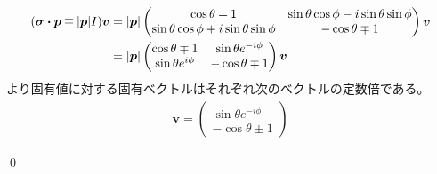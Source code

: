 \documentclass[uplatex,dvipdfmx,a4paper,11pt]{jlreq}
\makeatletter
\newcommand{\pp}{\bm{p}}
\theoremstyle{definition}
\renewenvironment{proof}[1][\proofname]{\par
  \normalfont
  \topsep6\p@\@plus6\p@ \trivlist
  \item[\hskip\labelsep{\bfseries #1}\@addpunct{\bfseries}]\ignorespaces\quad\par
}{%
  \qed\endtrivlist\@endpefalse
}
\renewcommand\proofname{証明}
\makeatother
\begin{document}
\begin{proof}
  \begin{align}
    (\bm{\sigma}\vdot\pp \mp |\pp|I)\bm{v} & = |\pp|\begin{pmatrix}
                                                      \cos\theta \mp 1                         & \sin\theta\cos\phi - i\sin\theta\sin\phi \\
                                                      \sin\theta\cos\phi + i\sin\theta\sin\phi & -\cos\theta \mp 1
                                                    \end{pmatrix}\bm{v} \\
                                           & = |\pp|\begin{pmatrix}
                                                      \cos\theta \mp 1     & \sin\theta e^{-i\phi} \\
                                                      \sin\theta e^{i\phi} & -\cos\theta \mp 1
                                                    \end{pmatrix}\bm{v}
  \end{align}
  より固有値に対する固有ベクトルはそれぞれ次のベクトルの定数倍である。
  \begin{align}
    \bm{v} = \begin{pmatrix}
               \sin\theta e^{-i\phi} \\
               -\cos\theta \pm 1
             \end{pmatrix}
  \end{align}

\end{proof}
\end{document}

